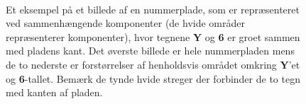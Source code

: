 \begin{figure}[htp]
  \centering
  \begin{minipage}[c]{8 cm}
	\end{minipage}\\
  \begin{minipage}[c]{8 cm}
	\end{minipage}
	\caption{Et eksempel på et billede af en nummerplade, som er repræsenteret ved sammenhængende komponenter (de hvide områder repræsenterer komponenter), hvor tegnene \textbf{Y} og \textbf{6} er groet sammen med pladens kant. Det øverste billede er hele nummerpladen mens de to nederste er forstørrelser af henholdsvis området omkring \textbf{Y}'et og \textbf{6}-tallet. Bemærk de tynde hvide streger der forbinder de to tegn med kanten af pladen.}
  \label{fig:skygge}
\end{figure}




